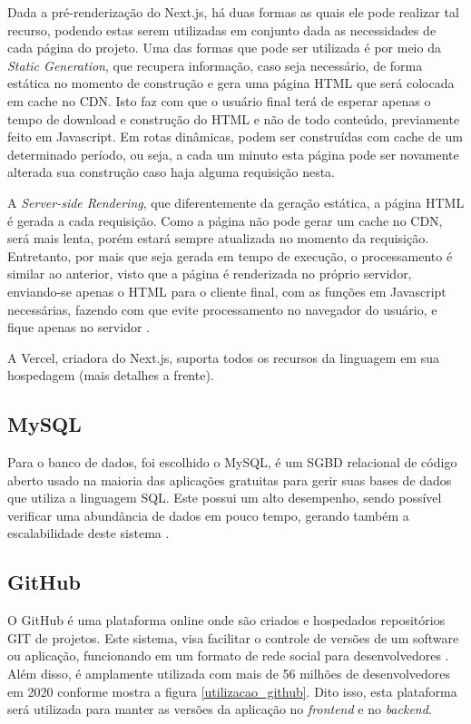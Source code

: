 Dada a pré-renderização do Next.js, há duas formas as quais ele pode realizar tal recurso, podendo estas serem utilizadas em conjunto dada as necessidades de cada página do projeto. Uma das formas que pode ser utilizada é por meio da \textit{Static Generation}, que recupera informação, caso seja necessário, de forma estática no momento de construção e gera uma página HTML que será colocada em cache no CDN. Isto faz com que o usuário final terá de esperar apenas o tempo de download e construção do HTML e não de todo conteúdo, previamente feito em Javascript. Em rotas dinâmicas, podem ser construídas com cache de um determinado período, ou seja, a cada um minuto esta página pode ser novamente alterada sua construção caso haja alguma requisição nesta.

A \textit{Server-side Rendering}, que diferentemente da geração estática, a página HTML é gerada a cada requisição. Como a página não pode gerar um cache no CDN, será mais lenta, porém estará sempre atualizada no momento da requisição. Entretanto, por mais que seja gerada em tempo de execução, o processamento é similar ao anterior, visto que a página é renderizada no próprio servidor, enviando-se apenas o HTML para o cliente final, com as funções em Javascript necessárias, fazendo com que evite processamento no navegador do usuário, e fique apenas no servidor \cite{VERCEL}.

A Vercel, criadora do Next.js, suporta todos os recursos da linguagem em sua hospedagem (mais detalhes a frente).

\subsection{MySQL}
Para o banco de dados, foi escolhido o MySQL, é um SGBD relacional de código aberto usado na maioria das aplicações gratuitas para gerir suas bases de dados que utiliza a linguagem SQL. Este possui um alto desempenho, sendo possível verificar uma abundância de dados em pouco tempo, gerando também a escalabilidade deste sistema \cite{HEUSER}.

\subsection{GitHub}
O GitHub é uma plataforma online onde são criados e hospedados repositórios GIT de projetos. Este sistema, visa facilitar o controle de versões de um software ou aplicação, funcionando em um formato de rede social para desenvolvedores \cite{SANTACROCE}. Além disso, é amplamente utilizada com mais de 56 milhões de desenvolvedores em 2020 conforme mostra a figura \ref{utilizacao_github}. Dito isso, esta plataforma será utilizada para manter as versões da aplicação no \textit{frontend} e no \textit{backend}.

